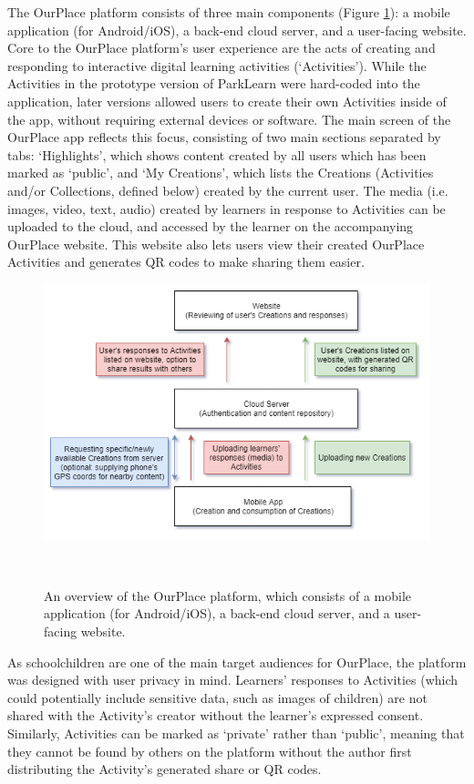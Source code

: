 The OurPlace platform consists of three main components (Figure \ref{fig:PlatformDiagram}): a mobile application (for Android/iOS), a back-end cloud server, and a user-facing website. Core to the OurPlace platform's user experience are the acts of creating and responding to interactive digital learning activities (`Activities'). While the Activities in the prototype version of ParkLearn were hard-coded into the application, later versions allowed users to create their own Activities inside of the app, without requiring external devices or software. The main screen of the OurPlace app reflects this focus, consisting of two main sections separated by tabs: `Highlights', which shows content created by all users which has been marked as `public', and `My Creations', which lists the Creations (Activities and/or Collections, defined below) created by the current user. The media (i.e. images, video, text, audio) created by learners in response to Activities can be uploaded to the cloud, and accessed by the learner on the accompanying OurPlace website. This website also lets users view their created OurPlace Activities and generates QR codes to make sharing them easier.

\begin{figure}
  \centering
  \includegraphics[width=0.9\columnwidth]{images/chapter05/OurPlace_platform.png}
  \caption[Overview of the OurPlace platform]{An overview of the OurPlace platform, which consists of a mobile application (for Android/iOS), a back-end cloud server, and a user-facing website.}~\label{fig:PlatformDiagram}
\end{figure}

As schoolchildren are one of the main target audiences for OurPlace, the platform was designed with user privacy in mind. Learners' responses to Activities (which could potentially include sensitive data, such as images of children) are not shared with the Activity's creator without the learner's expressed consent. Similarly, Activities can be marked as `private' rather than `public', meaning that they cannot be found by others on the platform without the author first distributing the Activity's generated share or QR codes. 

